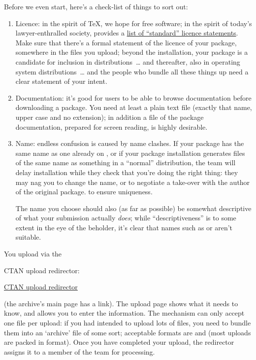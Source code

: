 Before we even start, here's a check-list of things to sort out:
\begin{enumerate}
\item Licence: in the spirit of \TeX{}, we hope for free software; in
  the spirit of today's lawyer-enthralled society, 
  provides a %
  \href{http://mirror.ctan.org/help/Catalogue/licenses.html}{list of ``standard'' licence statements}.
  Make sure that there's a formal statement of the licence of your
  package, somewhere in the files you upload; beyond the 
  installation, your package is a candidate for inclusion in \AllTeX{}
  distributions~\dots{} and thereafter, also in operating system
  distributions~\dots{} and the people who bundle all these things up
  need a clear statement of your intent. 
\item Documentation: it's good for users to be able to browse
  documentation before downloading a package.  You need at least a
  plain text  file (exactly that name, upper case and no
   extension); in addition a
   file of the package documentation, prepared for screen
  reading, is highly desirable.
\item Name: endless confusion is caused by name clashes.  If your
  package has the same name as one already on , or if your
  package installation generates files of the same name as something
  in a ``normal'' distribution, the  team will delay
  installation while they check that you're doing the right thing:
  they may nag you to change the name, or to negotiate a take-over
  with the author of the original package. %
   to ensure uniqueness.
  
  The name you choose should also (as far as possible) be somewhat
  descriptive of what your submission actually \emph{does}; while
  ``descriptiveness'' is to some extent in the eye of the beholder,
  it's clear that names such as  or 
  aren't suitable.
\end{enumerate}
You upload via the
\begin{flatversion}
  CTAN upload redirector: 
\end{flatversion}
\begin{hyperversion}
  \href{http://www.ctan.org/upload}{CTAN upload redirector}
\end{hyperversion}
(the archive's main page has a link).  The upload page shows what it
needs to know, and allows you to enter the information.  The mechanism
can only accept one file per upload: if you had intended to upload
lots of files, you need to bundle them into an `archive' file of some
sort; acceptable formats are  and 
(most uploads are packed in  format).  Once you have
completed your upload, the redirector assigns it to a member of the
team for processing.

